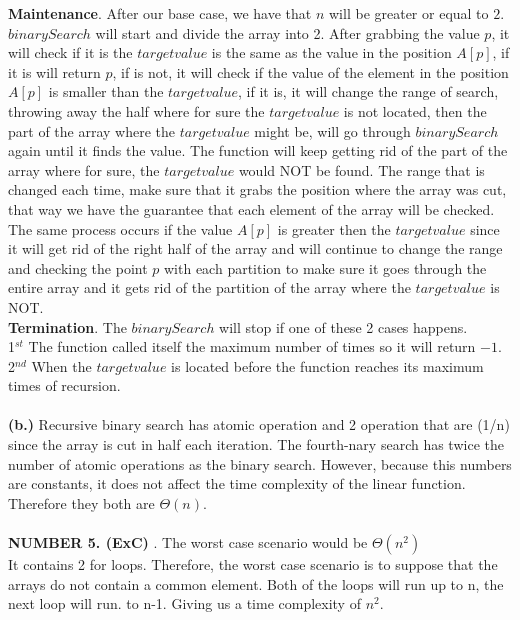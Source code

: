 \documentclass[10pt]{article}
\begin{document}
\textbf{Maintenance}. After our base case, we have that $n$ will be  greater or equal to $2$. $binarySearch$ will start and divide the array into 2. After grabbing the value $p$, it will check if it is the $target value$ is the same as the value in the position $A[p]$, if it is will return $p$, if is not, it will check if the value of the element in the position $A[p]$ is smaller than the $target value$, if it is, it will change the range of search, throwing away the half where for sure the $target value$ is not located, then the part of the array where the $target value$ might be, will go through $binarySearch$ again until it finds the value. The function will keep getting rid of the part of the array where for sure, the $target value$ would NOT be found. The range that is changed each time, make sure that it grabs the position where the array was cut, that way we have the guarantee that each element of the array will be checked. The same process occurs if the value $A[p]$ is greater then the $target value$ since it will get rid of the right half of the array and will continue to change the range and checking the point $p$ with each partition to make sure it goes through the entire array and it gets rid of the partition of the array where the $target value$ is NOT.\\
\textbf{Termination}. The $binarySearch$ will stop if one of these 2 cases happens.\\ 1$^{st}$ The function called itself the maximum number of times so it will return $-1$. \\2$^{nd}$ When the $target value$ is located before the function reaches its maximum times of recursion. \\\\
\textbf{(b.)} Recursive binary search has atomic operation and 2 operation that are (1/n) since the array is cut in half each iteration. The fourth-nary search has twice the number of atomic operations as the binary search. However, because this numbers are constants, it does not affect the time complexity of the linear function. Therefore they both are $\Theta(n)$. \\\\
\textbf{NUMBER 5. (ExC)} . The worst case scenario would be $\Theta(n^2)$\\ It contains 2 for loops. Therefore, the worst case scenario is to suppose that the arrays do not contain a common element. Both of the loops will run up to n, the next loop will run. to n-1. Giving us a time complexity of $n^2$. \\\\
 
\end{document}
